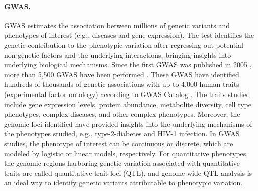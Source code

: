 \documentclass{book}
\begin{document}
\begin{refsection}
\paragraph*{GWAS.} GWAS estimates the association between millions of genetic variants and phenotypes of interest (e.g., diseases and gene expression).
The test identifies the genetic contribution to the phenotypic variation after regressing out potential non-genetic factors and the underlying interactions, bringing insights into underlying biological mechanisms.
Since the first GWAS was published in 2005 \cite{Klein2005Complement}, more than 5,500 GWAS have been performed \cite{Watanabe2019A}.
These GWAS have identified hundreds of thousands of genetic associations with up to 4,000 human traits (experimental factor ontology) according to GWAS Catalog \cite{Buniello2018The}.
The traits studied include gene expression levels, protein abundance, metabolite diversity, cell type phenotypes, complex diseases, and other complex phenotypes.
Moreover, the genomic loci identified have provided insights into the underlying mechanisms of the phenotypes studied, e.g., type-2-diabetes and HIV-1 infection.
In GWAS studies, the phenotype of interest can be continuous or discrete, which are modeled by logistic or linear models, respectively.
For quantitative phenotypes, the genomic regions harboring genetic variation associated with quantitative traits are called quantitative trait loci (QTL), and genome-wide QTL analysis is an ideal way to identify genetic variants attributable to phenotypic variation.

\begin{figure}[!hbt]
  \centering
\end{figure}
\end{refsection}
\end{document}

